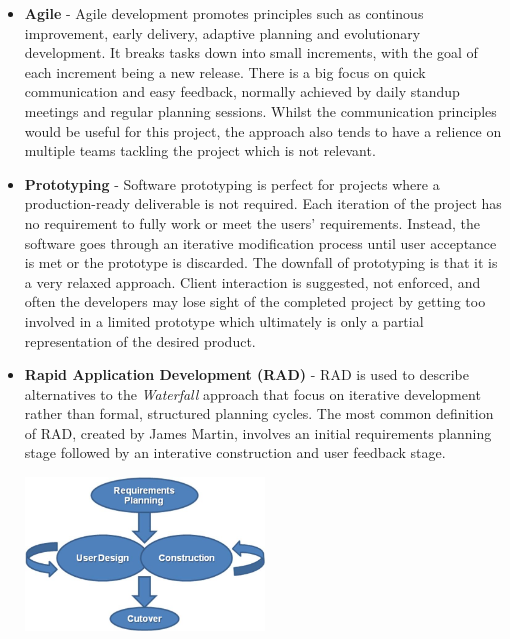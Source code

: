 \begin{itemize}
  \item \textbf{Agile} - 
    Agile development promotes principles such as continous improvement, early delivery, adaptive planning and evolutionary development. It breaks tasks down into small increments, with the goal of each increment being a new release. There is a big focus on quick communication and easy feedback, normally achieved by daily standup meetings and regular planning sessions. Whilst the communication principles would be useful for this project, the approach also tends to have a relience on multiple teams tackling the project which is not relevant.
  \item \textbf{Prototyping} - 
    Software prototyping is perfect for projects where a production-ready deliverable is not required. Each iteration of the project has no requirement to fully work or meet the users' requirements. Instead, the software goes through an iterative modification process until user acceptance is met or the prototype is discarded.
    The downfall of prototyping is that it is a very relaxed approach. Client interaction is suggested, not enforced, and often the developers may lose sight of the completed project by getting too involved in a limited prototype which ultimately is only a partial representation of the desired product.
  \item \textbf{Rapid Application Development (RAD)} - 
    RAD is used to describe alternatives to the \emph{Waterfall} approach that focus on iterative development rather than formal, structured planning cycles. The most common definition of RAD, created by James Martin, involves an initial requirements planning stage followed by an interative construction and user feedback stage.

    \begin{minipage}{\linewidth}
      \centering
      \includegraphics[width=0.5\textwidth]{./img/rad-model.jpg}
    \end{minipage}


\end{itemize}
